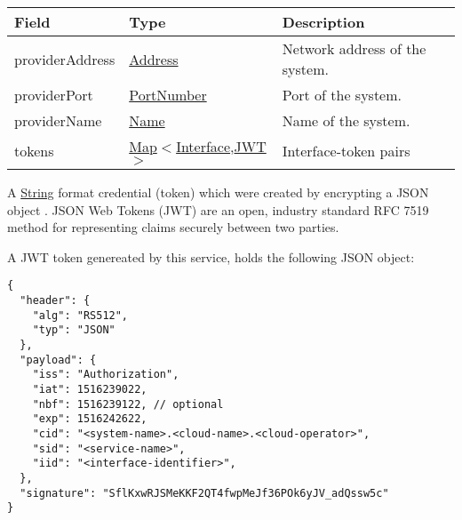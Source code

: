 \documentclass[a4paper]{arrowhead}
\newcommand{\fref}[1]{{\textcolor{ArrowheadBlue}{\hyperref[sec:functions:#1]{#1}}}}
\newcommand{\pref}[1]{{\textcolor{ArrowheadGrey}{\hyperref[sec:model:primitives:#1]{#1}}}}
\begin{document}
\label{sec:model:TokenData}

\begin{table}[ht!]
\begin{tabularx}{\textwidth}{| p{4.25cm} | p{3.5cm} | X |} \hline
\rowcolor{gray!33} Field & Type      & Description \\ \hline
providerAddress & \pref{Address} & Network address of the system. \\ \hline
providerPort & \pref{PortNumber} & Port of the system. \\ \hline
providerName & \pref{Name} & Name of the system. \\ \hline
tokens &  \pref{Map}$<$\pref{Interface},\hyperref[sec:model:JWT]{JWT}$>$ & Interface-token pairs \\ \hline 
\end{tabularx}
\end{table}

\label{sec:model:Token}

A \pref{String} format credential (token) which were created by encrypting a JSON object \cite{bray2014json}. JSON Web Tokens (JWT) are an open, industry standard RFC 7519 method for representing claims securely between two parties.

A JWT token genereated by this service, holds the following JSON object:

\begin{lstlisting}[language=http,label={lst:authorization},caption={Content of a \fref{JWT token} generated by this service.}]
{
  "header": {
    "alg": "RS512",
    "typ": "JSON"
  },
  "payload": {
    "iss": "Authorization",
    "iat": 1516239022,
    "nbf": 1516239122, // optional
    "exp": 1516242622,
    "cid": "<system-name>.<cloud-name>.<cloud-operator>",
    "sid": "<service-name>",
    "iid": "<interface-identifier>",
  },
  "signature": "SflKxwRJSMeKKF2QT4fwpMeJf36POk6yJV_adQssw5c"
}
\end{lstlisting}
\end{document}

